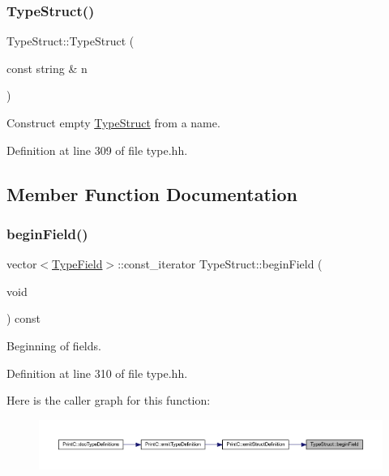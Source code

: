 \subsubsection{\texorpdfstring{TypeStruct()}{TypeStruct()}\hspace{0.1cm}{\footnotesize\ttfamily [2/2]}}
{\footnotesize\ttfamily Type\+Struct\+::\+Type\+Struct (\begin{DoxyParamCaption}\item[{const string \&}]{n }\end{DoxyParamCaption})\hspace{0.3cm}{\ttfamily [inline]}}



Construct empty \mbox{\hyperlink{class_type_struct}{Type\+Struct}} from a name. 



Definition at line 309 of file type.\+hh.



\subsection{Member Function Documentation}
\mbox{\label{class_type_struct_a16f83552f46976a606175eb082fef7ec}} 
\subsubsection{\texorpdfstring{beginField()}{beginField()}}
{\footnotesize\ttfamily vector$<$\mbox{\hyperlink{struct_type_field}{Type\+Field}}$>$\+::const\+\_\+iterator Type\+Struct\+::begin\+Field (\begin{DoxyParamCaption}\item[{void}]{ }\end{DoxyParamCaption}) const\hspace{0.3cm}{\ttfamily [inline]}}



Beginning of fields. 



Definition at line 310 of file type.\+hh.

Here is the caller graph for this function\+:
\nopagebreak
\begin{figure}[H]
\begin{center}
\leavevmode
\includegraphics[width=350pt]{class_type_struct_a16f83552f46976a606175eb082fef7ec_icgraph}
\end{center}
\end{figure}
\mbox{\label{class_type_struct_a24e7e1af1cc231759cecf8445532f613}} 

